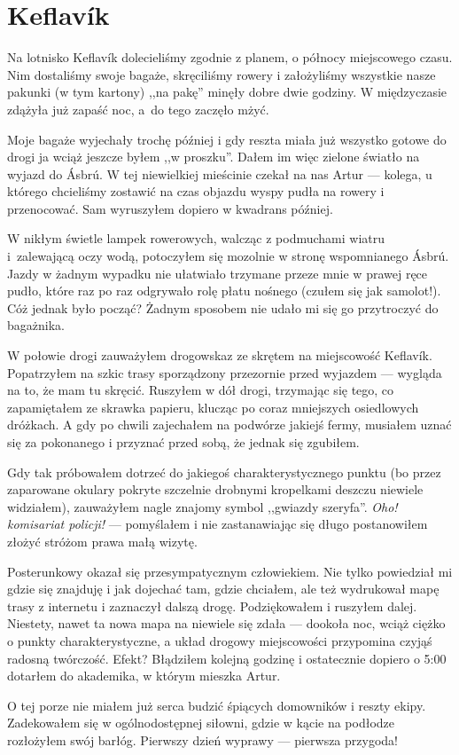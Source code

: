 \section*{Keflavík}

Na lotnisko Keflavík dolecieliśmy zgodnie z planem, o północy miejscowego czasu. Nim dostaliśmy swoje bagaże, skręciliśmy rowery i założyliśmy wszystkie nasze pakunki (w tym kartony) ,,na pakę'' minęły dobre dwie godziny. W międzyczasie zdążyła już zapaść noc, a~do tego zaczęło mżyć.

Moje bagaże wyjechały trochę później i gdy reszta miała już wszystko gotowe do drogi ja wciąż jeszcze byłem ,,w proszku''. Dałem im więc zielone światło na wyjazd do Ásbrú. W tej niewielkiej mieścinie czekał na nas Artur --- kolega, u którego chcieliśmy zostawić na czas objazdu wyspy pudła na rowery i przenocować. Sam wyruszyłem dopiero w kwadrans później.

W nikłym świetle lampek rowerowych, walcząc z podmuchami wiatru i~zalewającą oczy wodą, potoczyłem się mozolnie w stronę wspomnianego Ásbrú. Jazdy w żadnym wypadku nie ułatwiało trzymane przeze mnie w prawej ręce pudło, które raz po raz odgrywało rolę płatu nośnego (czułem się jak samolot!). Cóż jednak było począć? Żadnym sposobem nie udało mi się go przytroczyć do bagażnika.

W połowie drogi zauważyłem drogowskaz ze skrętem na miejscowość Keflavík. Popatrzyłem na szkic trasy sporządzony przezornie przed wyjazdem --- wygląda na to, że mam tu skręcić. Ruszyłem w dół drogi, trzymając się tego, co zapamiętałem ze skrawka papieru, klucząc po coraz mniejszych osiedlowych dróżkach. A gdy po chwili zajechałem na podwórze jakiejś fermy, musiałem uznać się za pokonanego i przyznać przed sobą, że jednak się zgubiłem.

Gdy tak próbowałem dotrzeć do jakiegoś charakterystycznego punktu (bo przez zaparowane okulary pokryte szczelnie drobnymi kropelkami deszczu niewiele widziałem), zauważyłem nagle znajomy symbol ,,gwiazdy szeryfa''. \emph{Oho! komisariat policji!} --- pomyślałem i nie zastanawiając się długo postanowiłem złożyć stróżom prawa małą wizytę.

Posterunkowy okazał się przesympatycznym człowiekiem. Nie tylko powiedział mi gdzie się znajduję i jak dojechać tam, gdzie chciałem, ale też wydrukował mapę trasy z internetu i zaznaczył dalszą drogę. Podziękowałem i ruszyłem dalej. Niestety, nawet ta nowa mapa na niewiele się zdała --- dookoła noc, wciąż ciężko o punkty charakterystyczne, a układ drogowy miejscowości przypomina czyjąś radosną twórczość. Efekt? Błądziłem kolejną godzinę i ostatecznie dopiero o 5:00 dotarłem do akademika, w którym mieszka Artur.

O tej porze nie miałem już serca budzić śpiących domowników i reszty ekipy. Zadekowałem się w ogólnodostępnej siłowni, gdzie w kącie na podłodze rozłożyłem swój barłóg. Pierwszy dzień wyprawy --- pierwsza przygoda!